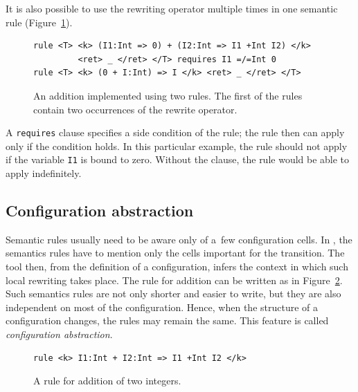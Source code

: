 \documentclass[nolot,nolof,nocover,printed]{fithesis3}
\begin{document}
It is also possible to use the rewriting operator multiple times in one semantic rule (Figure~\ref{fig:twoRewrites}).

\begin{figure}[ht]
\begin{lstlisting}
rule <T> <k> (I1:Int => 0) + (I2:Int => I1 +Int I2) </k>
         <ret> _ </ret> </T> requires I1 =/=Int 0
rule <T> <k> (0 + I:Int) => I </k> <ret> _ </ret> </T>
\end{lstlisting}
\caption{An addition implemented using two rules. The first of the rules contain two occurrences of the rewrite operator.}
\label{fig:twoRewrites}
\end{figure}
A \texttt{requires} clause specifies a side condition of the rule; the rule then can apply only if the condition holds. In this particular example, the rule should not apply if the variable \texttt{I1} is bound to zero. Without the clause, the rule would be able to apply indefinitely.

 
\subsection{Configuration abstraction}

Semantic rules usually need to be aware only of a~few configuration cells. In \K, the semantics rules have to mention only the cells important for the transition. The \K tool then, from the definition of a configuration, infers the context in which such local rewriting takes place. The rule for addition can be written as in Figure~\ref{ruleAddInKCell}. Such semantics rules are not only shorter and easier to write, but they are also independent on most of the configuration. Hence, when the structure of a configuration changes, the rules may remain the same. This feature is called \textit{configuration abstraction}.


\begin{figure}[ht]
\begin{lstlisting}
rule <k> I1:Int + I2:Int => I1 +Int I2 </k>
\end{lstlisting}
\caption{A rule for addition of two integers.}
\label{ruleAddInKCell}
\end{figure}
\end{document}
